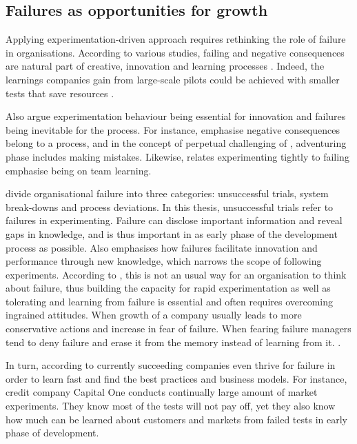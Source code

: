 \subsection{Failures as opportunities for growth} \label{failures}
Applying experimentation-driven approach requires rethinking the role of failure in organisations. According to various studies, failing and negative consequences are natural part of creative, innovation and learning processes \citep{hennessey19881,shalley2004leaders,andriopoulos2000enhancing}. Indeed, the learnings companies gain from large-scale pilots could be achieved with smaller tests that save resources \citep{anderson2011step}.

Also \citet{lee2004mixed} argue experimentation behaviour being essential for innovation and failures being inevitable for the process. For instance, \citet{hennessey19881} emphasise negative consequences belong to a process, and in the concept of perpetual challenging of \citet{andriopoulos2000enhancing}, adventuring phase includes making mistakes. Likewise,\citet{edmondson1999psychological} relates experimenting tightly to failing emphasise being on team learning. 

\citet{garvin2008yours} divide organisational failure into three categories: unsuccessful trials, system break-downs and process deviations. In this thesis, unsuccessful trials refer to failures in experimenting. Failure can disclose important information and reveal gaps in knowledge, and is thus important in as early phase of the development process as possible. \citep{buijs2007innovation,thomke2001enlightened} Also \citet{sitkin1992learning} emphasises how failures facilitate innovation and performance through new knowledge, which narrows the scope of following experiments. According to \citet{thomke2001enlightened}, this is not an usual way for an organisation to think about failure, thus building the capacity for rapid experimentation as well as tolerating and learning from failure is essential and often requires overcoming ingrained attitudes. When growth of a company usually leads to more conservative actions and increase in fear of failure. When fearing failure managers tend to deny failure and erase it from the memory instead of learning from it. \citep{amabile2008creativity}. 

In turn, according to \citet{farson2002failuretolerantleader} currently succeeding companies even thrive for failure in order to learn fast and find the best practices and business models. For instance, credit company Capital One conducts continually large amount of market experiments. They know most of the tests will not pay off, yet they also know how much can be learned about customers and markets from failed tests in early phase of development. \citep{farson2002failuretolerantleader}

